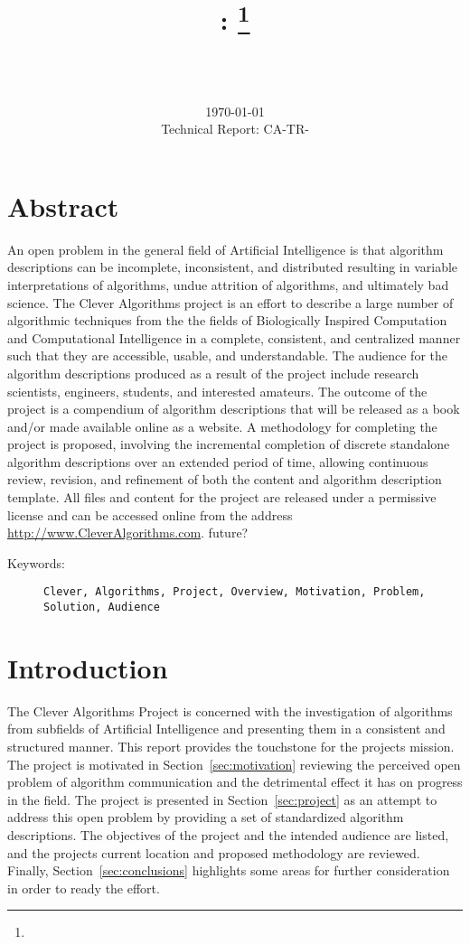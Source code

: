 \documentclass[a4paper, 11pt]{article}
\title{{\myreporttitle}: {\myreportsubtitle}\footnote{\myreportlicense}}
\author{\myreportauthor\\{\myreportemail}\\\small\myreportproject}
\date{\today\\{\small{Technical Report: CA-TR-\myreportdate}}}
\begin{document}
\maketitle

\section*{Abstract} 
An open problem in the general field of Artificial Intelligence is that algorithm descriptions can be incomplete, inconsistent, and distributed resulting in variable interpretations of algorithms, undue attrition of algorithms, and ultimately bad science. 
The Clever Algorithms project is an effort to describe a large number of algorithmic techniques from the the fields of Biologically Inspired Computation and Computational Intelligence in a complete, consistent, and centralized manner such that they are accessible, usable, and understandable. 
The audience for the algorithm descriptions produced as a result of the project include research scientists, engineers, students, and interested amateurs.
The outcome of the project is a compendium of algorithm descriptions that will be released as a book and/or made available online as a website.
A methodology for completing the project is proposed, involving the incremental completion of discrete standalone algorithm descriptions over an extended period of time, allowing continuous review, revision, and refinement of both the content and algorithm description template.
All files and content for the project are released under a permissive license and can be accessed online from the address \url{http://www.CleverAlgorithms.com}.
future?

\begin{description}
	\item[Keywords:] {\small\texttt{Clever, Algorithms, Project, Overview, Motivation, Problem, Solution, Audience}}
\end{description} 

\section{Introduction}
\label{sec:introduction}
The Clever Algorithms Project is concerned with the investigation of algorithms from subfields of Artificial Intelligence and presenting them in a consistent and structured manner. This report provides the touchstone for the projects mission.
The project is motivated in Section~\ref{sec:motivation} reviewing the perceived open problem of algorithm communication and the detrimental effect it has on progress in the field. The project is presented in Section~\ref{sec:project} as an attempt to address this open problem by providing a set of standardized algorithm descriptions. The objectives of the project and the intended audience are listed, and the projects current location and proposed methodology are reviewed. Finally, Section~\ref{sec:conclusions} highlights some areas for further consideration in order to ready the effort.
\end{document}
